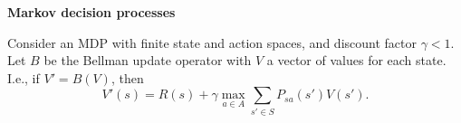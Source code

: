 \item {} {\bf Markov decision processes}

Consider an MDP with finite state and action spaces, and discount
factor $\gamma < 1$.  Let $B$ be the Bellman update operator with
$V$ a vector of values for each state. I.e., if $V' = B(V)$, then
\[
V'(s) = R(s) + \gamma \max_{a\in A} \sum_{s'\in S} P_{sa}(s')
V(s').
\]

\begin{enumerate}

\ifnum{} {
  
} \fi


\ifnum{} {
  
} \fi

\end{enumerate}

